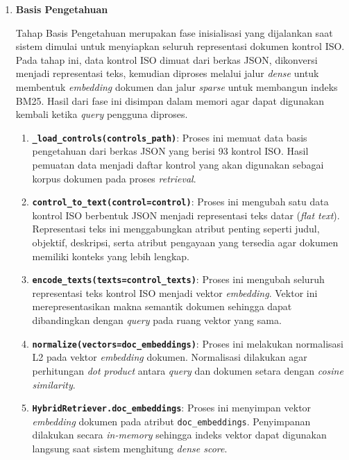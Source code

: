 \begin{enumerate}
\item \textbf{Basis Pengetahuan}

Tahap Basis Pengetahuan merupakan fase inisialisasi yang dijalankan saat sistem dimulai untuk menyiapkan seluruh representasi dokumen kontrol ISO. Pada tahap ini, data kontrol ISO dimuat dari berkas JSON, dikonversi menjadi representasi teks, kemudian diproses melalui jalur \textit{dense} untuk membentuk \textit{embedding} dokumen dan jalur \textit{sparse} untuk membangun indeks BM25. Hasil dari fase ini disimpan dalam memori agar dapat digunakan kembali ketika \textit{query} pengguna diproses.

\begin{enumerate}[label=\alph*., leftmargin=1.1cm]
\item {\footnotesize\textbf{\texttt{\_load\_controls(controls\_path)}}}: Proses ini memuat data basis pengetahuan dari berkas JSON yang berisi 93 kontrol ISO. Hasil pemuatan data menjadi daftar kontrol yang akan digunakan sebagai korpus dokumen pada proses \textit{retrieval}.

\item {\footnotesize\textbf{\texttt{control\_to\_text(control=control)}}}: Proses ini mengubah satu data kontrol ISO berbentuk JSON menjadi representasi teks datar (\textit{flat text}). Representasi teks ini menggabungkan atribut penting seperti judul, objektif, deskripsi, serta atribut pengayaan yang tersedia agar dokumen memiliki konteks yang lebih lengkap.

\item {\footnotesize\textbf{\texttt{encode\_texts(texts=control\_texts)}}}: Proses ini mengubah seluruh representasi teks kontrol ISO menjadi vektor \textit{embedding}. Vektor ini merepresentasikan makna semantik dokumen sehingga dapat dibandingkan dengan \textit{query} pada ruang vektor yang sama.

\item {\footnotesize\textbf{\texttt{normalize(vectors=doc\_embeddings)}}}: Proses ini melakukan normalisasi L2 pada vektor \textit{embedding} dokumen. Normalisasi dilakukan agar perhitungan \textit{dot product} antara \textit{query} dan dokumen setara dengan \textit{cosine similarity}.

\item {\footnotesize\textbf{\texttt{HybridRetriever.doc\_embeddings}}}: Proses ini menyimpan vektor \textit{embedding} dokumen pada atribut \texttt{doc\_embeddings}. Penyimpanan dilakukan secara \textit{in-memory} sehingga indeks vektor dapat digunakan langsung saat sistem menghitung \textit{dense score}.


\end{enumerate}
\end{enumerate}

